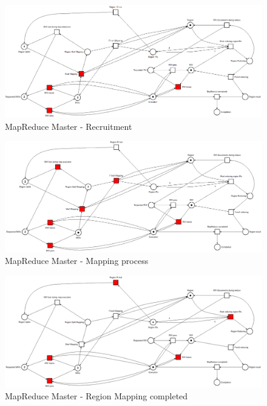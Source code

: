 \begin{figure}[!ht]
    \centering
    \includegraphics[width=\linewidth]{document/chapters/chapter_6/images/master_petri_net_1.png}
    \caption{MapReduce Master - Recruitment}
    \label{fig:master_petri_net_1}
\end{figure}

\begin{figure}[!ht]
    \centering
    \includegraphics[width=\linewidth]{document/chapters/chapter_6/images/master_petri_net_2.png}
    \caption{MapReduce Master - Mapping process}
    \label{fig:master_petri_net_2}
\end{figure}

\begin{figure}[!ht]
    \centering
    \includegraphics[width=\linewidth]{document/chapters/chapter_6/images/master_petri_net_3.png}
    \caption{MapReduce Master - Region Mapping completed}
    \label{fig:master_petri_net_3}
\end{figure}

